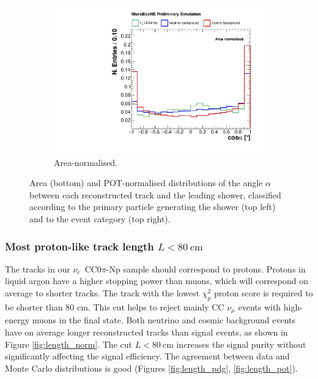 \begin{figure}[htbp]
\begin{subfigure}{0.49\textwidth}
    \includegraphics[width=\linewidth]{figures/h_track_shower_angle_norm.pdf}
    \caption{Area-normalised.} \label{fig:angle_integral}
  \end{subfigure}
  \caption{Area (bottom) and POT-normalised distributions of the angle $\alpha$ between each reconstructed track and the leading shower, classified according to the primary particle generating the shower (top left) and to the event category (top right).}
\end{figure}

\subsubsection*{Most proton-like track length $L < 80~\mathrm{cm}$}
The tracks in our $\nu_e$~CC0$\pi$-Np sample should correspond to protons. Protons in liquid argon have a higher stopping power than muons, which will correspond on average to shorter tracks. The track with the lowest $\chi_{p}^{2}$ proton score is required to be shorter than 80 cm. This cut helps to reject mainly CC $\nu_{\mu}$ events with high-energy muons in the final state. 
Both neutrino and cosmic background events have on average longer reconstructed tracks than signal events, as shown in Figure \ref{fig:length_norm}. The cut $L < 80~$cm increases the signal purity without significantly affecting the signal efficiency. The agreement between data and Monte Carlo distributions is good (Figures \ref{fig:length_pdg}, \ref{fig:length_pot}). %

